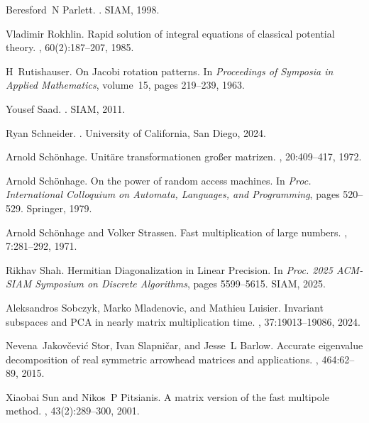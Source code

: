 \documentclass{article}
\begin{document}
\begin{thebibliography}{10}
Beresford~N Parlett.
.
\newblock SIAM, 1998.

Vladimir Rokhlin.
\newblock Rapid solution of integral equations of classical potential theory.
, 60(2):187--207, 1985.

H~Rutishauser.
\newblock On {J}acobi rotation patterns.
\newblock In {\em Proceedings of Symposia in Applied Mathematics}, volume~15, pages 219--239, 1963.

Yousef Saad.
.
\newblock SIAM, 2011.

Ryan Schneider.
.
\newblock University of California, San Diego, 2024.

Arnold Sch{\"o}nhage.
\newblock Unit{\"a}re transformationen gro{\ss}er matrizen.
, 20:409--417, 1972.

Arnold Sch{\"o}nhage.
\newblock On the power of random access machines.
\newblock In {\em Proc. International Colloquium on Automata, Languages, and Programming}, pages 520--529. Springer, 1979.

Arnold Sch{\"o}nhage and Volker Strassen.
\newblock Fast multiplication of large numbers.
, 7:281--292, 1971.

Rikhav Shah.
\newblock Hermitian {Diagonalization in Linear P}recision.
\newblock In {\em Proc. 2025 ACM-SIAM Symposium on Discrete Algorithms}, pages 5599--5615. SIAM, 2025.

Aleksandros Sobczyk, Marko Mladenovic, and Mathieu Luisier.
\newblock Invariant subspaces and {PCA} in nearly matrix multiplication time.
, 37:19013--19086, 2024.

Nevena~Jakov{\v{c}}evi{\'c} Stor, Ivan Slapni{\v{c}}ar, and Jesse~L Barlow.
\newblock Accurate eigenvalue decomposition of real symmetric arrowhead matrices and applications.
, 464:62--89, 2015.

Xiaobai Sun and Nikos~P Pitsianis.
\newblock A matrix version of the fast multipole method.
, 43(2):289--300, 2001.


\end{thebibliography}
\end{document}
